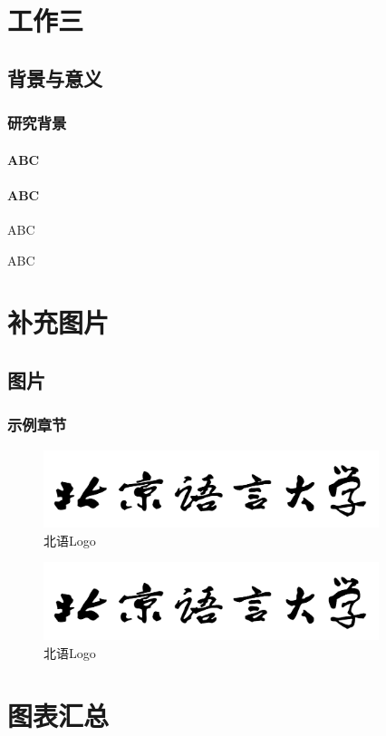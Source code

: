 \documentclass[doctor,final,twoside]{blcuthesis}
\begin{document}
\chapter{工作三}
\section{背景与意义}
\subsection{研究背景}
\subsubsection{ABC}
\subsubsection{ABC}
ABC\citet{Xiang:20}

ABC\citep{Xiang:20}

\nocite{*}



\appendix

\chapter{补充图片}
\section{图片}
\subsection{示例章节}
\begin{figure}[h]
	\centering
	\includegraphics[width=9.8cm]{figures/BLCULogoText.png}
	\caption{北语Logo}
\end{figure}

\begin{figure}[h]
	\centering
	\includegraphics[width=9.8cm]{figures/BLCULogoText.png}
	\caption{北语Logo}
\end{figure}

\chapter{图表汇总}
\listoffiguresandtables
\end{document}
